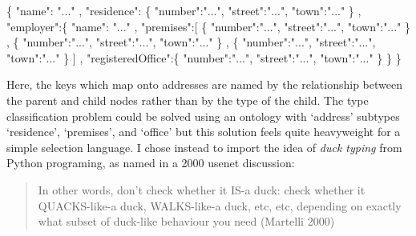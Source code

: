 \documentclass[12pt, ]{article}
\newenvironment{Shaded}{}{}
\newcommand{\StringTok}[1]{\textcolor[rgb]{0.25,0.44,0.63}{{#1}}}
\newcommand{\NormalTok}[1]{{#1}}
\begin{document}
\begin{Shaded}
\begin{Highlighting}[]
\NormalTok{\{}
   \StringTok{"name"}\NormalTok{: }\StringTok{"..."}
\NormalTok{,  }\StringTok{"residence"}\NormalTok{: \{}
      \StringTok{"number"}\NormalTok{:}\StringTok{"..."}\NormalTok{, }\StringTok{"street"}\NormalTok{:}\StringTok{"..."}\NormalTok{, }\StringTok{"town"}\NormalTok{:}\StringTok{"..."} 
   \NormalTok{\}}
\NormalTok{,  }\StringTok{"employer"}\NormalTok{:\{}
      \StringTok{"name"}\NormalTok{: }\StringTok{"..."}
   \NormalTok{,  }\StringTok{"premises"}\NormalTok{:[}
         \NormalTok{\{ }\StringTok{"number"}\NormalTok{:}\StringTok{"..."}\NormalTok{, }\StringTok{"street"}\NormalTok{:}\StringTok{"..."}\NormalTok{, }\StringTok{"town"}\NormalTok{:}\StringTok{"..."} \NormalTok{\}}
      \NormalTok{,  \{ }\StringTok{"number"}\NormalTok{:}\StringTok{"..."}\NormalTok{, }\StringTok{"street"}\NormalTok{:}\StringTok{"..."}\NormalTok{, }\StringTok{"town"}\NormalTok{:}\StringTok{"..."} \NormalTok{\}}
      \NormalTok{,  \{ }\StringTok{"number"}\NormalTok{:}\StringTok{"..."}\NormalTok{, }\StringTok{"street"}\NormalTok{:}\StringTok{"..."}\NormalTok{, }\StringTok{"town"}\NormalTok{:}\StringTok{"..."} \NormalTok{\}}
      \NormalTok{]}
   \NormalTok{,  }\StringTok{"registeredOffice"}\NormalTok{:\{}
         \StringTok{"number"}\NormalTok{:}\StringTok{"..."}\NormalTok{, }\StringTok{"street"}\NormalTok{:}\StringTok{"..."}\NormalTok{, }\StringTok{"town"}\NormalTok{:}\StringTok{"..."}
      \NormalTok{\}}
   \NormalTok{\}}
\NormalTok{\}  }
\end{Highlighting}
\end{Shaded}

Here, the keys which map onto addresses are named by the relationship
between the parent and child nodes rather than by the type of the child.
The type classification problem could be solved using an ontology with
`address' subtypes `residence', `premises', and `office' but this
solution feels quite heavyweight for a simple selection language. I
chose instead to import the idea of \emph{duck typing} from Python
programing, as named in a 2000 usenet discussion:

\begin{quote}
In other words, don't check whether it IS-a duck: check whether it
QUACKS-like-a duck, WALKS-like-a duck, etc, etc, depending on exactly
what subset of duck-like behaviour you need (Martelli 2000)
\end{quote}
\end{document}
